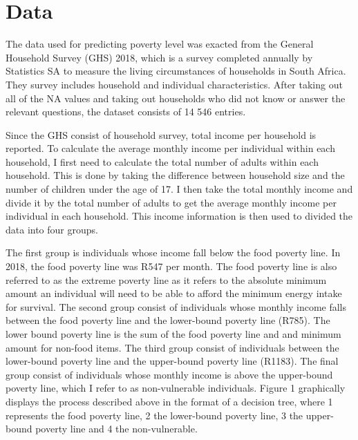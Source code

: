 \documentclass[11pt,preprint, authoryear]{elsarticle}
\numberwithin{equation}{section}
\numberwithin{figure}{section}
\numberwithin{table}{section}
\begin{document}
\hypertarget{data}{%
\section{Data}\label{data}}

The data used for predicting poverty level was exacted from the General
Household Survey (GHS) 2018, which is a survey completed annually by
Statistics SA to measure the living circumstances of households in South
Africa. They survey includes household and individual characteristics.
After taking out all of the NA values and taking out households who did
not know or answer the relevant questions, the dataset consists of 14
546 entries.

Since the GHS consist of household survey, total income per household is
reported. To calculate the average monthly income per individual within
each household, I first need to calculate the total number of adults
within each household. This is done by taking the difference between
household size and the number of children under the age of 17. I then
take the total monthly income and divide it by the total number of
adults to get the average monthly income per individual in each
household. This income information is then used to divided the data into
four groups.

The first group is individuals whose income fall below the food poverty
line. In 2018, the food poverty line was R547 per month. The food
poverty line is also referred to as the extreme poverty line as it
refers to the absolute minimum amount an individual will need to be able
to afford the minimum energy intake for survival. The second group
consist of individuals whose monthly income falls between the food
poverty line and the lower-bound poverty line (R785). The lower bound
poverty line is the sum of the food poverty line and and minimum amount
for non-food items. The third group consist of individuals between the
lower-bound poverty line and the upper-bound poverty line (R1183). The
final group consist of individuals whose monthly income is above the
upper-bound poverty line, which I refer to as non-vulnerable
individuals. Figure 1 graphically displays the process described above
in the format of a decision tree, where 1 represents the food poverty
line, 2 the lower-bound poverty line, 3 the upper-bound poverty line and
4 the non-vulnerable.
\end{document}
